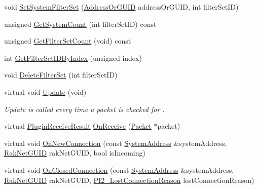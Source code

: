 \begin{DoxyCompactItemize}
\item 
void \hyperlink{class_rak_net_1_1_message_filter_abcf11f3fbd390c94d90ddd7f88545788}{Set\-System\-Filter\-Set} (\hyperlink{struct_rak_net_1_1_address_or_g_u_i_d}{Address\-Or\-G\-U\-I\-D} address\-Or\-G\-U\-I\-D, int filter\-Set\-I\-D)
\item 
unsigned \hyperlink{class_rak_net_1_1_message_filter_acd631be69f9a3a1d08e7637268fd373d}{Get\-System\-Count} (int filter\-Set\-I\-D) const 
\item 
unsigned \hyperlink{class_rak_net_1_1_message_filter_ae97438fe5afb0ba7053b0a076691993f}{Get\-Filter\-Set\-Count} (void) const 
\item 
int \hyperlink{class_rak_net_1_1_message_filter_a8ea14d83f33442201f4de159c339f8d9}{Get\-Filter\-Set\-I\-D\-By\-Index} (unsigned index)
\item 
void \hyperlink{class_rak_net_1_1_message_filter_a8ff3f21fe8dd99d0981ddefbe83471bf}{Delete\-Filter\-Set} (int filter\-Set\-I\-D)
\item 
\hypertarget{class_rak_net_1_1_message_filter_a4a266d5969acabfa66be942d5b0588b2}{virtual void \hyperlink{class_rak_net_1_1_message_filter_a4a266d5969acabfa66be942d5b0588b2}{Update} (void)}\label{class_rak_net_1_1_message_filter_a4a266d5969acabfa66be942d5b0588b2}

\begin{DoxyCompactList}\small\item\em Update is called every time a packet is checked for . \end{DoxyCompactList}\item 
virtual \hyperlink{group___p_l_u_g_i_n___i_n_t_e_r_f_a_c_e___g_r_o_u_p_ga89998adaafb29e5d879113b992161085}{Plugin\-Receive\-Result} \hyperlink{class_rak_net_1_1_message_filter_ab3a96d9d18086da2cd8ee834116ff5e4}{On\-Receive} (\hyperlink{struct_rak_net_1_1_packet}{Packet} $\ast$packet)
\item 
virtual void \hyperlink{class_rak_net_1_1_message_filter_aa596e84f76f6ce1c8a20464de498b786}{On\-New\-Connection} (const \hyperlink{struct_rak_net_1_1_system_address}{System\-Address} \&system\-Address, \hyperlink{struct_rak_net_1_1_rak_net_g_u_i_d}{Rak\-Net\-G\-U\-I\-D} rak\-Net\-G\-U\-I\-D, bool is\-Incoming)
\item 
virtual void \hyperlink{class_rak_net_1_1_message_filter_a786df4d598682ab2ed1db4dc341a08b3}{On\-Closed\-Connection} (const \hyperlink{struct_rak_net_1_1_system_address}{System\-Address} \&system\-Address, \hyperlink{struct_rak_net_1_1_rak_net_g_u_i_d}{Rak\-Net\-G\-U\-I\-D} rak\-Net\-G\-U\-I\-D, \hyperlink{group___p_l_u_g_i_n___i_n_t_e_r_f_a_c_e___g_r_o_u_p_ga376cc546fd6892c2ead48cd51796c8b8}{P\-I2\-\_\-\-Lost\-Connection\-Reason} lost\-Connection\-Reason)
\end{DoxyCompactItemize}
